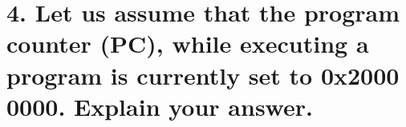 \documentclass[11pt]{article}
\begin{document}



















\newpage
\section*{4. Let us assume that the program counter (PC), while executing a program is currently set to 0x2000 0000. Explain your answer.}
\end{document}
